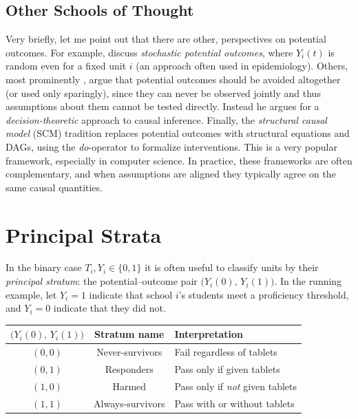 \documentclass[11pt]{exam}
\theoremstyle{plain}
\begin{document}
\subsection{Other Schools of Thought}
Very briefly, let me point out that there are other, perspectives on potential outcomes. For example, \citet{greenland1987interpretation,vanderweele2012stochastic} discuss \emph{stochastic potential outcomes}, where $Y_i(t)$ is random even for a fixed unit $i$ (an approach often used in epidemiology). Others, most prominently \citet{dawid2000causal}, argue that potential outcomes should be avoided altogether (or used only sparingly), since they can never be observed jointly and thus assumptions about them cannot be tested directly. Instead he argues for a \emph{decision-theoretic} approach to causal inference. Finally, the \emph{structural causal model} (SCM) tradition \citep{pearl2009causality} replaces potential outcomes with structural equations and DAGs, using the \emph{do}-operator to formalize interventions. This is a very popular framework, especially in computer science. In practice, these frameworks are often complementary, and when assumptions are aligned they typically agree on the same causal quantities.

\section{Principal Strata}
In the binary case $T_i, Y_i \in \{0,1\}$ it is often useful to classify units by their \emph{principal stratum}:
the potential–outcome pair $\big(Y_i(0),\,Y_i(1)\big)$. In the running example, let $Y_i=1$ indicate that
school $i$’s students meet a proficiency threshold, and $Y_i=0$ indicate that they did not.

\begin{center}
\begin{tabular}{@{}ccl@{}}
\toprule
$\big(Y_i(0),\,Y_i(1)\big)$ & \textbf{Stratum name} & \textbf{Interpretation} \\
\midrule
$(0,0)$ & Never-survivors & Fail regardless of tablets \\
$(0,1)$ & Responders      & Pass only if given tablets \\
$(1,0)$ & Harmed          & Pass only if \emph{not} given tablets \\
$(1,1)$ & Always-survivors& Pass with or without tablets \\
\bottomrule
\end{tabular}
\end{center}
\end{document}
